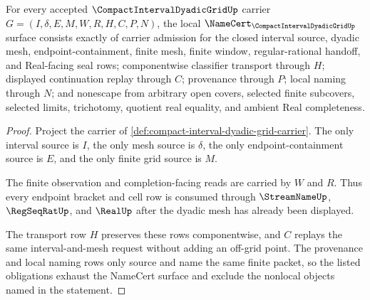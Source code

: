 \begin{theorem}
\label{thm:compact-interval-dyadic-grid-namecert-obligations}
For every accepted $\CompactIntervalDyadicGridUp$ carrier $G=(I,\delta,E,M,W,R,H,C,P,N)$, the local $\NameCert_{\CompactIntervalDyadicGridUp}$ surface consists exactly of carrier admission for the closed interval source, dyadic mesh, endpoint-containment, finite mesh, finite window, regular-rational handoff, and Real-facing seal rows; componentwise classifier transport through $H$; displayed continuation replay through $C$; provenance through $P$; local naming through $N$; and nonescape from arbitrary open covers, selected finite subcovers, selected limits, trichotomy, quotient real equality, and ambient Real completeness.
\end{theorem}
\begin{proof}
Project the carrier of \autoref{def:compact-interval-dyadic-grid-carrier}. The only interval source is $I$, the only mesh source is $\delta$, the only endpoint-containment source is $E$, and the only finite grid source is $M$.

The finite observation and completion-facing reads are carried by $W$ and $R$. Thus every endpoint bracket and cell row is consumed through $\StreamNameUp$, $\RegSeqRatUp$, and $\RealUp$ after the dyadic mesh has already been displayed.

The transport row $H$ preserves these rows componentwise, and $C$ replays the same interval-and-mesh request without adding an off-grid point. The provenance and local naming rows only source and name the same finite packet, so the listed obligations exhaust the NameCert surface and exclude the nonlocal objects named in the statement.
\end{proof}

